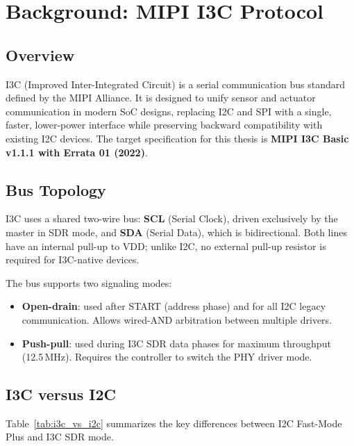 \documentclass[12pt, a4paper, oneside]{report}
\begin{document}
\chapter{Background: MIPI I3C Protocol}

\section{Overview}

I3C (Improved Inter-Integrated Circuit) is a serial communication bus standard defined
by the MIPI Alliance. It is designed to unify sensor and actuator communication in
modern SoC designs, replacing I2C and SPI with a single, faster, lower-power interface
while preserving backward compatibility with existing I2C devices. The target
specification for this thesis is \textbf{MIPI I3C Basic v1.1.1 with Errata 01 (2022)}.

\section{Bus Topology}

I3C uses a shared two-wire bus: \textbf{SCL} (Serial Clock), driven exclusively by the
master in SDR mode, and \textbf{SDA} (Serial Data), which is bidirectional. Both lines
have an internal pull-up to VDD; unlike I2C, no external pull-up resistor is required
for I3C-native devices.

The bus supports two signaling modes:
\begin{itemize}
  \item \textbf{Open-drain}: used after START (address phase) and for all I2C legacy
        communication. Allows wired-AND arbitration between multiple drivers.
  \item \textbf{Push-pull}: used during I3C SDR data phases for maximum throughput
        (12.5\,MHz). Requires the controller to switch the PHY driver mode.
\end{itemize}

\section{I3C versus I2C}

Table~\ref{tab:i3c_vs_i2c} summarizes the key differences between I2C Fast-Mode Plus
and I3C SDR mode.
\end{document}
